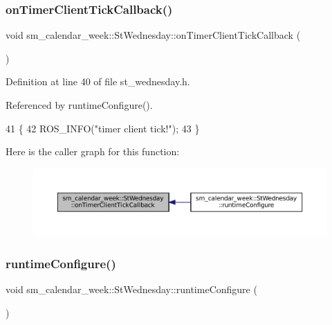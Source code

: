 \subsubsection{\texorpdfstring{on\+Timer\+Client\+Tick\+Callback()}{onTimerClientTickCallback()}}
{\footnotesize\ttfamily void sm\+\_\+calendar\+\_\+week\+::\+St\+Wednesday\+::on\+Timer\+Client\+Tick\+Callback (\begin{DoxyParamCaption}{ }\end{DoxyParamCaption})\hspace{0.3cm}{\ttfamily [inline]}}



Definition at line 40 of file st\+\_\+wednesday.\+h.



Referenced by runtime\+Configure().


\begin{DoxyCode}
41     \{
42         ROS\_INFO(\textcolor{stringliteral}{"timer client tick!"});
43     \}
\end{DoxyCode}
Here is the caller graph for this function\+:
\nopagebreak
\begin{figure}[H]
\begin{center}
\leavevmode
\includegraphics[width=350pt]{structsm__calendar__week_1_1StWednesday_a1ee9efe65b63cb472eaaf7c49f072ebc_icgraph}
\end{center}
\end{figure}
\mbox{\label{structsm__calendar__week_1_1StWednesday_a5f47539c7bdbfaa8c808b5045e95444c}} 
\subsubsection{\texorpdfstring{runtime\+Configure()}{runtimeConfigure()}}
{\footnotesize\ttfamily void sm\+\_\+calendar\+\_\+week\+::\+St\+Wednesday\+::runtime\+Configure (\begin{DoxyParamCaption}{ }\end{DoxyParamCaption})\hspace{0.3cm}{\ttfamily [inline]}}



